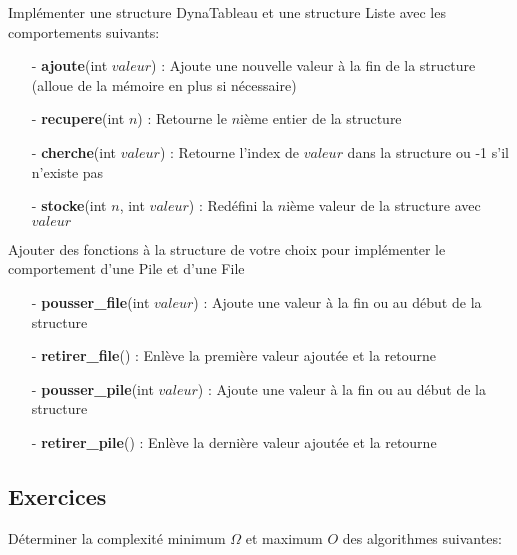 \documentclass[11pt]{extarticle}
\begin{document}
\vspace{1cm}
Implémenter une structure DynaTableau et une structure Liste avec les comportements suivants:
\begin{itemize}
\item[ - \textbf{ajoute}(int $valeur$)]: Ajoute une nouvelle valeur à la fin de la structure (alloue de la mémoire en plus si nécessaire)
\item[ - \textbf{recupere}(int $n$)]: Retourne le $n$ième entier de la structure
\item[ - \textbf{cherche}(int $valeur$)]: Retourne l'index de $valeur$ dans la structure ou -1 s'il n'existe pas
\item[ - \textbf{stocke}(int $n$, int $valeur$)]: Redéfini la $n$ième valeur de la structure avec $valeur$
\end{itemize}
\vspace{1cm}
Ajouter des fonctions à la structure de votre choix pour implémenter le comportement d'une Pile et d'une File
\begin{itemize}
\item[ - \textbf{pousser\_file}(int $valeur$)]: Ajoute une valeur à la fin ou au début de la structure
\item[ - \textbf{retirer\_file}()]: Enlève la première valeur ajoutée et la retourne
\item[ - \textbf{pousser\_pile}(int $valeur$)]: Ajoute une valeur à la fin ou au début de la structure
\item[ - \textbf{retirer\_pile}()]: Enlève la dernière valeur ajoutée et la retourne
\end{itemize}
\subsection{Exercices}
Déterminer la complexité minimum $\Omega$ et maximum $O$ des algorithmes suivantes:
\end{document}

